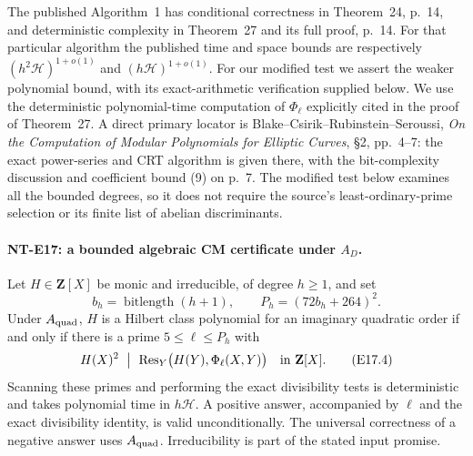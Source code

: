 The published Algorithm~1 has conditional correctness
in Theorem~24, p.~14, and deterministic complexity
in Theorem~27 and its full proof, p.~14.
For that particular algorithm the published time
and space bounds are respectively
$(h^2\mathcal H)^{1+o(1)}$ and
$(h\mathcal H)^{1+o(1)}$.
For our modified test we assert the weaker
polynomial bound, with its exact-arithmetic
verification supplied below.
We use the deterministic polynomial-time computation
of $\Phi_\ell$ explicitly cited in the proof
of Theorem~27.
A direct primary locator is
Blake--Csirik--Rubinstein--Seroussi,
\emph{On the Computation of Modular Polynomials
for Elliptic Curves}, \S2, pp.~4--7:
the exact power-series and CRT algorithm is
given there, with the bit-complexity discussion
and coefficient bound (9) on p.~7.
The modified test below examines all the bounded
degrees, so it does not require the source's
least-ordinary-prime selection or its finite list
of abelian discriminants.

\paragraph{NT-E17: a bounded algebraic CM certificate under $A_D$.}
Let $H\in\mathbf Z[X]$ be monic and irreducible,
of degree $h\ge1$, and set
\[
 b_h=\operatorname{bitlength}(h+1),\qquad
                     P_h=(72b_h+264)^2.
 \tag{E17.3}
\]
Under $A_{\rm quad}$, $H$ is a Hilbert class
polynomial for an imaginary quadratic order if
and only if there is a prime $5\le\ell\le P_h$ with
\[
 H(X)^2\ \bigm|\ 
       \operatorname{Res}_Y\bigl(H(Y),\Phi_\ell(X,Y)\bigr)
                           \quad\hbox{in }\mathbf Z[X].
 \tag{E17.4}
\]
Scanning these primes and performing the exact
divisibility tests is deterministic and takes
polynomial time in $h\mathcal H$.
A positive answer, accompanied by $\ell$ and
the exact divisibility identity, is valid
unconditionally. The universal correctness of
a negative answer uses $A_{\rm quad}$.
Irreducibility is part of the stated input promise.

